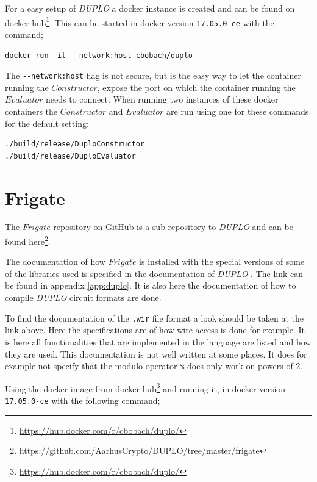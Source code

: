 \documentclass[twoside,11pt,openright]{report}
\newcommand{\DUPLO}{\textit{DUPLO} }
\begin{document}
\begin{appendices}
\bigskip

For a easy setup of \DUPLO a docker instance is created and can be found on docker hub\footnote{\url{https://hub.docker.com/r/cbobach/duplo/}}. This can be started in docker version \verb|17.05.0-ce| with the command;

\begin{center}
\begin{verbatim}
docker run -it --network:host cbobach/duplo
\end{verbatim}
\end{center}

The \verb|--network:host| flag is not secure, but is the easy way to let the container running the $Constructor$, expose the port on which the container running the $Evaluator$ needs to connect. When running two instances of these docker containers the $Constructor$ and $Evaluator$ are run using one for these commands for the default setting:

\begin{center}
\begin{verbatim}
./build/release/DuploConstructor 
./build/release/DuploEvaluator
\end{verbatim}
\end{center}


\section{Frigate}
\label{app:frigate}
The $Frigate$ repository on GitHub is a sub-repository to \DUPLO and can be found here\footnote{\url{https://github.com/AarhusCrypto/DUPLO/tree/master/frigate}}.

The documentation of how $Frigate$ is installed with the special versions of some of the libraries used is specified in the documentation of \DUPLO. The link can be found in appendix \ref{app:duplo}. It is also here the documentation of how to compile \DUPLO circuit formats are done.

To find the documentation of the \verb|.wir| file format a look should be taken at the link above. Here the specifications are of how wire access is done for example. It is here all functionalities that are implemented in the language are listed and how they are used. This documentation is not well written at some places. It does for example not specify that the modulo operator \verb|%| does only work on powers of $2$.

\bigskip

Using the docker image from docker hub\footnote{\url{https://hub.docker.com/r/cbobach/duplo/}} and running it, in docker version \verb|17.05.0-ce| with the following command;


\end{appendices}
\end{document}
